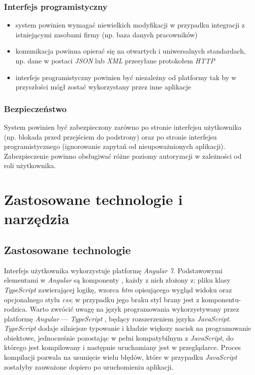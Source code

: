 \documentclass[eng,printmode,openany]{mgr}
\begin{document}
	\subsection{Interfejs programistyczny}
	\begin{itemize}
		\item system powinien wymagać niewielkich modyfikacji w przypadku integracji z istniejącymi zasobami firmy (np. baza danych pracowników)
		\item komunikacja powinna opierać się na otwartych i uniwersalnych standardach, np. dane w postaci \textit{JSON} lub \textit{XML} przesyłane protokołem \textit{HTTP}
		\item interfejs programistyczny powinien być niezależny od platformy tak by w przyszłości mógł zostać wykorzystany przez inne aplikacje
	\end{itemize}
	\subsection{Bezpieczeństwo}
	System powinien być zabezpieczony zarówno po stronie interfejsu użytkownika (np. blokada przed przejściem do podstrony) oraz po stronie interfejsu programistycznego (ignorowanie zapytań od nieupoważnionych aplikacji). Zabezpieczenie powinno obsługiwać różne poziomy autoryzacji w zależności od roli użytkownika.
	
	\newpage
	\chapter{Zastosowane technologie i narzędzia}
	\section{Zastosowane technologie}
	Interfejs użytkownika wykorzystuje platformę \textit{Angular 7}. Podstawowymi elementami w \textit{Angular} są komponenty \cite{angular-components}, każdy z nich złożony z: pliku klasy \textit{TypeScript} zawierającej logikę, wzorca \textit{htm} opisującego wygląd widoku oraz opcjonalnego stylu \textit{css}; w przypadku jego braku styl brany jest z komponentu-rodzica. Warto zwrócić uwagę na język programowania wykorzystywany przez platformę \textit{Angular} — \textit{TypeScript} \cite{msdn-ts}, będący rozszerzeniem języka \textit{JavaScript}. \textit{TypeScript} dodaje silniejsze typowanie i kładzie większy nacisk na programowanie obiektowe, jednocześnie pozostając w pełni kompatybilnym z \textit{JavaScript}, do którego jest kompilowany i  następnie uruchamiany jest w przeglądarce. Proces kompilacji pozwala na usunięcie wielu błędów, które w przypadku \textit{JavaScript} zostałyby zauważone dopiero po uruchomieniu aplikacji.
	
\end{document}
